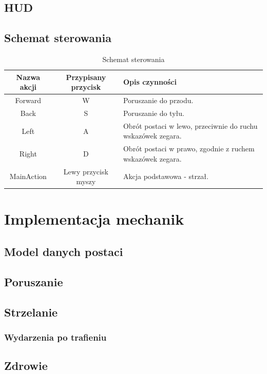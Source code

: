 \subsection{HUD}

\subsection{Schemat sterowania}

\begin{table}
    \small
    \centering
    \caption{Schemat sterowania}
    \label{tab:steering}
    \begin{tabularx}{\linewidth}{|c|c|X|}
        \hline
        Nazwa akcji & Przypisany przycisk & Opis czynności\\
        \hline \hline
        Forward & W & Poruszanie do przodu. \\
        \hline
        Back & S & Poruszanie do tyłu. \\
        \hline
        Left & A & Obrót postaci w lewo, przeciwnie do ruchu wskazówek zegara.\\
        \hline
        Right & D & Obrót postaci w prawo, zgodnie z ruchem wskazówek zegara.\\
        \hline 
        MainAction & Lewy przycisk myszy & Akcja podstawowa - strzał.\\
        \hline
    \end{tabularx}
\end{table}

\section{Implementacja mechanik}
\subsection{Model danych postaci}
\subsection{Poruszanie}
\subsection{Strzelanie}
\subsubsection{Wydarzenia po trafieniu}
\subsection{Zdrowie}
